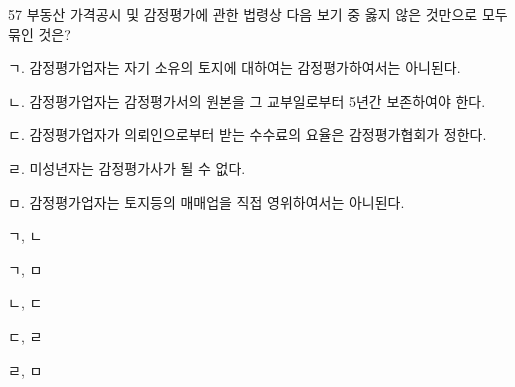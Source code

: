 \begin{question}{57}
부동산 가격공시 및 감정평가에 관한 법령상 다음 보기 중 옳지 않은 것만으로 모두 묶인 것은?
\begin{bogi}
ㄱ. 감정평가업자는 자기 소유의 토지에 대하여는 감정평가하여서는 아니된다. \par
ㄴ. 감정평가업자는 감정평가서의 원본을 그 교부일로부터 5년간 보존하여야 한다. \par
ㄷ. 감정평가업자가 의뢰인으로부터 받는 수수료의 요율은 감정평가협회가 정한다. \par
ㄹ. 미성년자는 감정평가사가 될 수 없다. \par
ㅁ. 감정평가업자는 토지등의 매매업을 직접 영위하여서는 아니된다. \par
\end{bogi}
\begin{choices}
  \item ㄱ, ㄴ
  \item ㄱ, ㅁ
  \item ㄴ, ㄷ
  \item ㄷ, ㄹ
  \item ㄹ, ㅁ
\end{choices}
\end{question}
